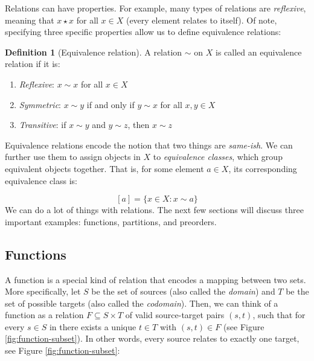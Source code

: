 \documentclass[
]{book}
\providecommand{\tightlist}{%
  \setlength{\itemsep}{0pt}\setlength{\parskip}{0pt}}
\theoremstyle{definition}
\newtheorem{definition}{Definition}[chapter]
\theoremstyle{definition}
\theoremstyle{definition}
\theoremstyle{definition}
\theoremstyle{remark}
\begin{document}
Relations can have properties. For example, many types of relations are \emph{reflexive}, meaning that \(x \star x\) for all \(x \in X\) (every element relates to itself). Of note, specifying three specific properties allow us to define equivalence relations:

\begin{definition}[Equivalence relation]

A relation \(\sim\) on \(X\) is called an equivalence relation if it is:

\begin{enumerate}
\def\labelenumi{\arabic{enumi}.}
\tightlist
\item
  \emph{Reflexive}: \(x \sim x\) for all \(x \in X\)
\item
  \emph{Symmetric}: \(x \sim y\) if and only if \(y \sim x\) for all \(x, y \in X\)
\item
  \emph{Transitive}: if \(x \sim y\) and \(y \sim z\), then \(x \sim z\)
\end{enumerate}

\end{definition}

Equivalence relations encode the notion that two things are \emph{same-ish}. We can further use them to assign objects in \(X\) to \emph{equivalence classes}, which group equivalent objects together. That is, for some element \(a \in X\), its corresponding equivalence class is:

\[[a] = \{ x \in X : x \sim a \}\]
We can do a lot of things with relations. The next few sections will discuss three important examples: functions, partitions, and preorders.

\subsection{Functions}\label{functions}

A function is a special kind of relation that encodes a mapping between two sets. More specifically, let \(S\) be the set of sources (also called the \emph{domain}) and \(T\) be the set of possible targets (also called the \emph{codomain}). Then, we can think of a function as a relation \(F \subseteq S \times T\) of valid source-target pairs \((s, t)\), such that for every \(s \in S\) in there exists a unique \(t \in T\) with \((s, t) \in F\) (see Figure \ref{fig:function-subset}). In other words, every source relates to exactly one target, see Figure \ref{fig:function-subset}:
\end{document}
